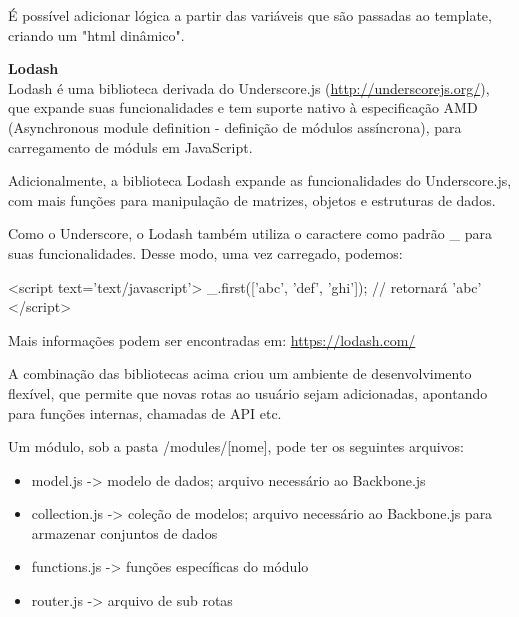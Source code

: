 \begin{code}

define([
    'jquery', 
    'lodash',
    'backbone', 
      'text!templates/media/MediaView.html'
], function($, _, Backbone, MediaViewTpl){
      var MediaView = Backbone.View.extend({
	render: function(){
          var data = {
            username: 'fulano@tal.org',
            nome: 'fulano'
          }
          $('#content').html(_.template(MediaViewTpl, data);
        }
      });
      ...            
\end{code}

É possível adicionar lógica a partir das variáveis que são passadas ao template,
criando um "html dinâmico".

\textbf{Lodash}\\
Lodash é uma biblioteca derivada do Underscore.js (\url{http://underscorejs.org/}),
que expande suas funcionalidades e tem suporte nativo à especificação AMD (Asynchronous
module definition - definição de módulos assíncrona), para carregamento de móduls
em JavaScript.

Adicionalmente, a biblioteca Lodash expande as funcionalidades do Underscore.js,
com mais funções para manipulação de matrizes, objetos e estruturas de dados.

Como o Underscore, o Lodash também utiliza o caractere como padrão \_ para suas
funcionalidades. Desse modo, uma vez carregado, podemos:

\begin{code}
  <script text='text/javascript'>
  _.first(['abc', 'def', 'ghi']);    // retornará 'abc'
  </script>
\end{code}

Mais informações podem ser encontradas em: \url{https://lodash.com/}


A combinação das bibliotecas acima criou um ambiente de desenvolvimento flexível,
que permite que novas rotas ao usuário sejam adicionadas, apontando para funções
internas, chamadas de API etc.

Um módulo, sob a pasta /modules/[nome], pode ter os seguintes arquivos:
\begin {itemize}
  \item model.js    -> modelo de dados; arquivo necessário ao Backbone.js
  \item collection.js   -> coleção de modelos; arquivo necessário ao Backbone.js para armazenar conjuntos de dados
  \item functions.js   -> funções específicas do módulo
  \item router.js   -> arquivo de sub rotas
\end{itemize}

